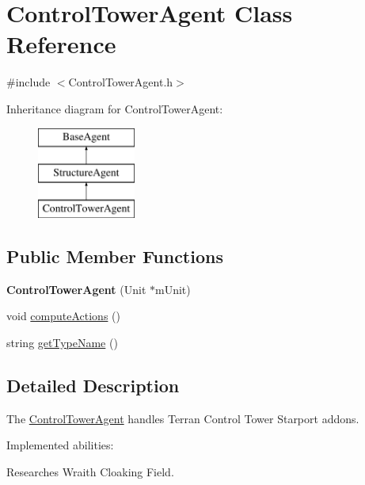 \hypertarget{class_control_tower_agent}{
\section{ControlTowerAgent Class Reference}
\label{class_control_tower_agent}
}


{\ttfamily \#include $<$ControlTowerAgent.h$>$}

Inheritance diagram for ControlTowerAgent:\begin{figure}[H]
\begin{center}
\leavevmode
\includegraphics[height=3.000000cm]{class_control_tower_agent}
\end{center}
\end{figure}
\subsection*{Public Member Functions}
\begin{DoxyCompactItemize}
\item 
\hypertarget{class_control_tower_agent_af70591f66fd3797fb2f4f3155bb589b2}{
{\bfseries ControlTowerAgent} (Unit $\ast$mUnit)}
\label{class_control_tower_agent_af70591f66fd3797fb2f4f3155bb589b2}

\item 
void \hyperlink{class_control_tower_agent_af2785d6938073b3b32ea100e88069a6c}{computeActions} ()
\item 
string \hyperlink{class_control_tower_agent_ad053f1acbe3922915dc7420c088a2618}{getTypeName} ()
\end{DoxyCompactItemize}


\subsection{Detailed Description}
The \hyperlink{class_control_tower_agent}{ControlTowerAgent} handles Terran Control Tower Starport addons.

Implemented abilities:
\begin{DoxyItemize}
\item Researches Wraith Cloaking Field.
\end{DoxyItemize}

